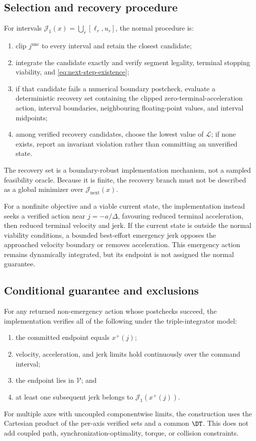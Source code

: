 \subsection{Selection and recovery procedure}

For intervals
\(\mathcal J_1(x)=\bigcup_r[\ell_r,u_r]\), the normal procedure is:
\begin{enumerate}
  \item clip \(j^{\mathrm{unc}}\) to every interval and retain the closest
  candidate;
  \item integrate the candidate exactly and verify segment legality, terminal
  stopping viability, and \eqref{eq:next-step-existence};
  \item if that candidate fails a numerical boundary postcheck, evaluate a
  deterministic recovery set containing the clipped zero-terminal-acceleration
  action, interval boundaries, neighbouring floating-point values, and
  interval midpoints;
  \item among verified recovery candidates, choose the lowest value of
  \(\mathcal L\); if none exists, report an invariant violation rather than
  committing an unverified state.
\end{enumerate}
The recovery set is a boundary-robust implementation mechanism, not a sampled
feasibility oracle.  Because it is finite, the recovery branch must not be
described as a global minimizer over
\(\mathcal J_{\mathrm{next}}(x)\).

For a nonfinite objective and a viable current state, the implementation
instead seeks a verified action near \(j=-a/\Delta\), favouring reduced
terminal acceleration, then reduced terminal velocity and jerk.  If the
current state is outside the normal viability conditions, a bounded
best-effort emergency jerk opposes the approached velocity boundary or removes
acceleration.  This emergency action remains dynamically integrated, but its
endpoint is not assigned the normal guarantee.

\subsection{Conditional guarantee and exclusions}

For any returned non-emergency action whose postchecks succeed, the
implementation verifies all of the following under the triple-integrator
model:
\begin{enumerate}
  \item the committed endpoint equals \(x^+(j)\);
  \item velocity, acceleration, and jerk limits hold continuously over the
  command interval;
  \item the endpoint lies in \(\mathcal V\); and
  \item at least one subsequent jerk belongs to
  \(\mathcal J_1(x^+(j))\).
\end{enumerate}
For multiple axes with uncoupled componentwise limits, the construction uses
the Cartesian product of the per-axis verified sets and a common \(\DT\).
This does not add coupled path, synchronization-optimality, torque, or
collision constraints.

